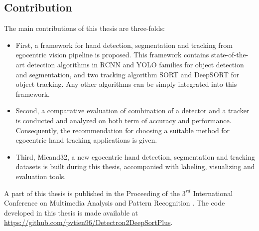\subsection{Contribution}
The main contributions of this thesis are three-folds:
\begin{itemize}
	\item First, a framework for hand detection, segmentation and tracking from egocentric vision pipeline is proposed. This framework contains state-of-the-art detection algorithms in RCNN and YOLO families for object detection and segmentation, and two tracking algorithm SORT and DeepSORT for object tracking. Any other algorithms can be simply integrated into this framework.
	\item Second, a comparative evaluation of combination of a detector and a tracker is conducted and analyzed on both term of accuracy and performance. Consequently, the recommendation for choosing a suitable method for egocentric hand tracking applications is given.
	\item Third, Micand32, a new egocentric hand detection, segmentation and tracking datasets is built during this thesis, accompanied with labeling, visualizing and evaluation tools.
\end{itemize}
A part of this thesis is published in the Proceeding of the \(3^{rd}\) International Conference on Multimedia Analysis and Pattern Recognition \cite{tien}. The code developed in this thesis is made available at  \url{https://github.com/pvtien96/Detectron2DeepSortPlus}.
